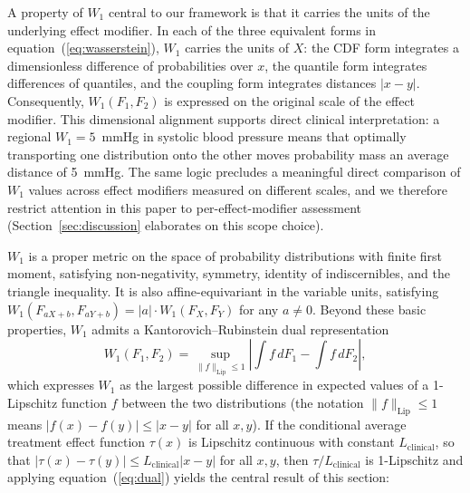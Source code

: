 \documentclass[AMA,Times1COL]{WileyNJDv5}
\begin{document}
A property of $W_1$ central to our framework is that it carries the units of the underlying effect modifier. In each of the three equivalent forms in equation~(\ref{eq:wasserstein}), $W_1$ carries the units of $X$: the CDF form integrates a dimensionless difference of probabilities over $x$, the quantile form integrates differences of quantiles, and the coupling form integrates distances $|x - y|$. Consequently, $W_1(F_1, F_2)$ is expressed on the original scale of the effect modifier. This dimensional alignment supports direct clinical interpretation: a regional $W_1 = 5$~mmHg in systolic blood pressure means that optimally transporting one distribution onto the other moves probability mass an average distance of 5~mmHg. The same logic precludes a meaningful direct comparison of $W_1$ values across effect modifiers measured on different scales, and we therefore restrict attention in this paper to per-effect-modifier assessment (Section~\ref{sec:discussion} elaborates on this scope choice).

$W_1$ is a proper metric on the space of probability distributions with finite first moment, satisfying non-negativity, symmetry, identity of indiscernibles, and the triangle inequality.\cite{villani2009} It is also affine-equivariant in the variable units, satisfying $W_1(F_{aX+b}, F_{aY+b}) = |a| \cdot W_1(F_X, F_Y)$ for any $a \neq 0$. Beyond these basic properties, $W_1$ admits a Kantorovich--Rubinstein dual representation\cite{villani2009}
\begin{equation}
W_1(F_1, F_2) = \sup_{\|f\|_{\text{Lip}} \leq 1} \left|\int f \, dF_1 - \int f \, dF_2\right|,
\label{eq:dual}
\end{equation}
which expresses $W_1$ as the largest possible difference in expected values of a 1-Lipschitz function $f$ between the two distributions (the notation $\|f\|_{\text{Lip}} \leq 1$ means $|f(x) - f(y)| \leq |x - y|$ for all $x, y$). If the conditional average treatment effect function $\tau(x)$ is Lipschitz continuous with constant $L_{\text{clinical}}$, so that $|\tau(x) - \tau(y)| \leq L_{\text{clinical}} |x - y|$ for all $x, y$, then $\tau / L_{\text{clinical}}$ is 1-Lipschitz and applying equation~(\ref{eq:dual}) yields the central result of this section:
\end{document}
